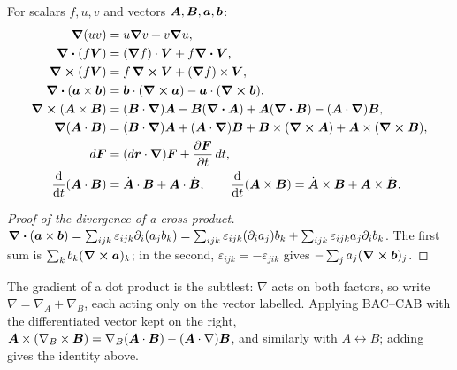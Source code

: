 \begin{fact}
For scalars $f,u,v$ and vectors $\vect{A},\vect{B},\lvect{a},\lvect{b}$:
\begin{align*}
    \grad(uv) &= u\grad v + v\grad u,\\
    \div(f\vect{V}) &= (\grad f)\cdot\vect{V} + f\div\vect{V},\\
    \curl(f\vect{V}) &= f\,\curl\vect{V} + (\grad f)\times\vect{V},\\
    \div(\lvect{a}\times\lvect{b}) &= \lvect{b}\cdot(\curl\lvect{a}) - \lvect{a}\cdot(\curl\lvect{b}),\\
    \curl(\vect{A}\times\vect{B}) &= (\vect{B}\cdot\grad)\vect{A} - \vect{B}(\div\vect{A}) + \vect{A}(\div\vect{B}) - (\vect{A}\cdot\grad)\vect{B},\\
    \grad(\vect{A}\cdot\vect{B}) &= (\vect{B}\cdot\grad)\vect{A} + (\vect{A}\cdot\grad)\vect{B} + \vect{B}\times(\curl\vect{A}) + \vect{A}\times(\curl\vect{B}),\\
    d\vect{F} &= (d\lvect{r}\cdot\grad)\vect{F} + \pdv{\vect{F}}{t}\,dt,\\
    \dv{t}(\vect{A}\cdot\vect{B}) &= \dot{\vect{A}}\cdot\vect{B} + \vect{A}\cdot\dot{\vect{B}},\qquad \dv{t}(\vect{A}\times\vect{B}) = \dot{\vect{A}}\times\vect{B} + \vect{A}\times\dot{\vect{B}}.
\end{align*}
\end{fact}
\begin{proof}[Proof of the divergence of a cross product]
$\div(\bm{a}\times\bm{b}) = \sum_{ijk}\varepsilon_{ijk}\partial_i(a_jb_k) = \sum_{ijk}\varepsilon_{ijk}(\partial_ia_j)b_k + \sum_{ijk}\varepsilon_{ijk}a_j\partial_ib_k$. The first sum is $\sum_k b_k(\curl\bm{a})_k$; in the second, $\varepsilon_{ijk} = -\varepsilon_{jik}$ gives $-\sum_ja_j(\curl\bm{b})_j$.
\end{proof}

The gradient of a dot product is the subtlest: $\nabla$ acts on both factors, so write $\nabla = \nabla_A + \nabla_B$, each acting only on the vector labelled. Applying BAC--CAB with the differentiated vector kept on the right, $\vect{A}\times(\nabla_B\times\vect{B}) = \nabla_B(\vect{A}\cdot\vect{B}) - (\vect{A}\cdot\nabla)\vect{B}$, and similarly with $A\leftrightarrow B$; adding gives the identity above.

